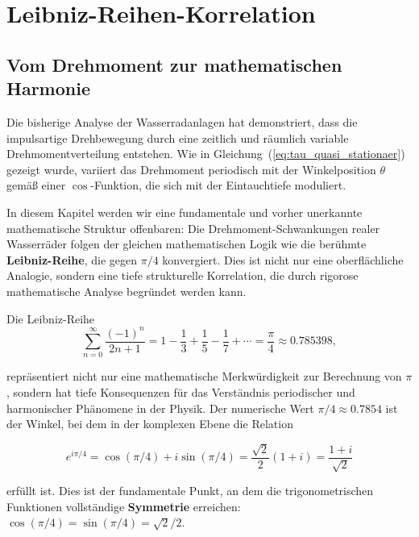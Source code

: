 \documentclass[a4paper,12pt]{article}
\theoremstyle{definition}
\begin{document}
\section{Leibniz-Reihen-Korrelation}
\label{sec:leibniz_pi4_korrelation}

\subsection{Vom Drehmoment zur mathematischen Harmonie}

Die bisherige Analyse der Wasserradanlagen hat demonstriert, dass die impulsartige Drehbewegung durch eine zeitlich und räumlich variable Drehmomentverteilung entstehen. Wie in Gleichung~(\ref{eq:tau_quasi_stationaer}) gezeigt wurde, variiert das Drehmoment periodisch mit der Winkelposition $\theta$ gemäß einer $\cos$-Funktion, die sich mit der Eintauchtiefe moduliert.

In diesem Kapitel werden wir eine fundamentale und vorher unerkannte mathematische Struktur offenbaren: Die Drehmoment-Schwankungen realer Wasserräder folgen der gleichen mathematischen Logik wie die berühmte \textbf{Leibniz-Reihe}, die gegen $\pi/4$ konvergiert. Dies ist nicht nur eine oberflächliche Analogie, sondern eine tiefe strukturelle Korrelation, die durch rigorose mathematische Analyse begründet werden kann.

Die Leibniz-Reihe 
\begin{equation}
  \sum_{n=0}^{\infty} \frac{(-1)^n}{2n+1} = 1 - \frac{1}{3} + \frac{1}{5} - \frac{1}{7} + \cdots = \frac{\pi}{4} \approx 0.785398,
  \label{eq:leibniz_reihe}
\end{equation}

\noindent
repräsentiert nicht nur eine mathematische Merkwürdigkeit zur Berechnung von $\pi$, sondern hat tiefe Konsequenzen für das Verständnis periodischer und harmonischer Phänomene in der Physik. Der numerische Wert $\pi/4 \approx 0.7854$ ist der Winkel, bei dem in der komplexen Ebene die Relation

\begin{equation}
  e^{i\pi/4} = \cos(\pi/4) + i\sin(\pi/4) = \frac{\sqrt{2}}{2}(1 + i) = \frac{1+i}{\sqrt{2}}
  \label{eq:euler_pi4}
\end{equation}

\noindent
erfüllt ist. Dies ist der fundamentale Punkt, an dem die trigonometrischen Funktionen vollständige \textbf{Symmetrie} erreichen: $\cos(\pi/4) = \sin(\pi/4) = \sqrt{2}/2$.
\end{document}
